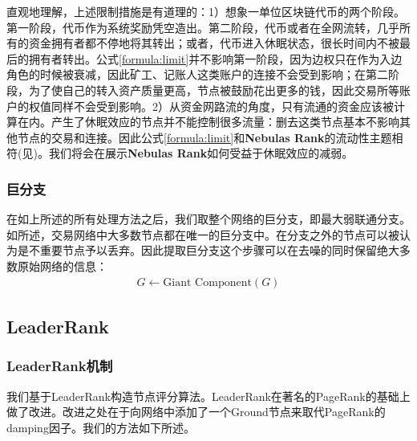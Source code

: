 直观地理解，上述限制措施是有道理的：1）想象一单位区块链代币的两个阶段。第一阶段，代币作为系统奖励凭空造出。第二阶段，代币或者在全网流转，几乎所有的资金拥有者都不停地将其转出；或者，代币进入休眠状态，很长时间内不被最后的拥有者转出。公式\ref{formula:limit}并不影响第一阶段，因为边权只在作为入边角色的时候被衰减，因此矿工、记账人这类账户的连接不会受到影响；在第二阶段，为了使自己的转入资产质量更高，节点被鼓励花出更多的钱，因此交易所等账户的权值同样不会受到影响。2）从资金网路流的角度，只有流通的资金应该被计算在内。产生了休眠效应的节点并不能控制很多流量：删去这类节点基本不影响其他节点的交易和连接。因此公式\ref{formula:limit}和\textbf{Nebulas Rank}的流动性主题相符(见)。我们将会在展示\textbf{Nebulas Rank}如何受益于休眠效应的减弱。

\subsubsection{巨分支}

在如上所述的所有处理方法之后，我们取整个网络的巨分支，即最大弱联通分支。如所述，交易网络中大多数节点都在唯一的巨分支中。在分支之外的节点可以被认为是不重要节点予以丢弃。因此提取巨分支这个步骤可以在去噪的同时保留绝大多数原始网络的信息：
\begin{align}
	G \leftarrow \text{Giant Component}(G)
\end{align}

\subsection{LeaderRank} \label{sec:leaderrank}

\subsubsection{LeaderRank机制}
我们基于LeaderRank\cite{Li2014}\cite{Chen2013}构造节点评分算法。LeaderRank在著名的PageRank\cite{Brin2010}\cite{page1999pagerank}的基础上做了改进。改进之处在于向网络中添加了一个Ground节点来取代PageRank的damping因子。我们的方法如下所述。

